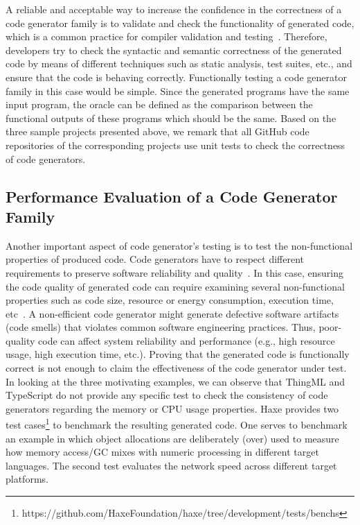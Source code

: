 A reliable and acceptable way to increase the confidence in the correctness of a code generator family is to validate and check the functionality of generated code, which is a common practice for compiler validation and testing~\cite{jorges2014back,stuermer2007systematic,sturmer2005overview}.
Therefore, developers try to check the syntactic and semantic correctness of the generated code by means of different techniques such as static analysis, test suites, etc., and ensure that the code is behaving correctly.  
Functionally testing a code generator family in this case would be simple. Since the generated programs have the same input program, the oracle can be defined as the comparison between the functional outputs of these programs which should be the same.
Based on the three sample projects presented above, we remark that all GitHub code repositories of the corresponding projects use unit tests to check the correctness of code generators.  

\subsection{Performance Evaluation of a Code Generator Family}

Another important aspect of code generator's testing is to test the non-functional properties of produced code. 
Code generators have to respect different requirements to preserve software reliability and quality~\cite{demertzi2011analyzing}. 
In this case, ensuring the code quality of generated code can require examining several non-functional properties such as code size, resource or energy consumption, execution time, etc~\cite{pan2006fast}.
A non-efficient code generator might generate defective software artifacts (code smells) that violates common software engineering practices. 
Thus, poor-quality code can affect system reliability and performance (e.g., high resource usage, high execution time, etc.).
Proving that the generated code is functionally correct is not enough to claim the effectiveness of the code generator under test. In looking at the three motivating examples, we can observe that ThingML and TypeScript do not provide any specific test to check the consistency of code generators regarding the memory or CPU usage properties. Haxe provides two test cases\footnote{https://github.com/HaxeFoundation/haxe/tree/development/tests/benchs} to benchmark the resulting generated code. One serves to benchmark an example in which object allocations are deliberately (over) used to measure how memory access/GC mixes with numeric processing in different target languages. The second test evaluates the network speed across different target platforms.

